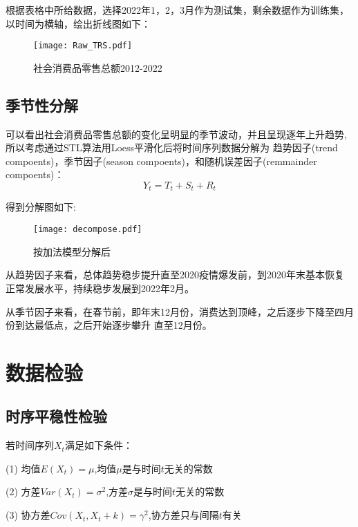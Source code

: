 \documentclass[12pt,a4paper]{nmmcm}
\begin{document}
根据表格中所给数据，选择2022年1，2，3月作为测试集，剩余数据作为训练集，以时间为横轴，绘出折线图如下：
\begin{figure}[H] %
  \centering %
  \texttt{[image: Raw\_TRS.pdf]} %
  \caption{社会消费品零售总额2012-2022} %
  \label{TRS} %
  \end{figure} 
\subsection{季节性分解}
可以看出社会消费品零售总额的变化呈明显的季节波动，并且呈现逐年上升趋势,
所以考虑通过STL算法用Loess平滑化后将时间序列数据分解为
趋势因子(trend compoents)，季节因子(season compoents)，和随机误差因子(remmainder compoents)\cite{stl}：
\begin{equation}
  Y_t = T_t + S_t + R_t
\end{equation}

得到分解图如下:
\begin{figure}[htbp] %
  \centering %
  \texttt{[image: decompose.pdf]} %
  \caption{按加法模型分解后} %
  \label{decompose} %
\end{figure} 

从趋势因子来看，总体趋势稳步提升直至2020疫情爆发前，到2020年末基本恢复
正常发展水平，持续稳步发展到2022年2月。
 \par 从季节因子来看，在春节前，即年末12月份，消费达到顶峰，之后逐步下降至四月份到达最低点，之后开始逐步攀升
直至12月份。
\section{数据检验}

\subsection{时序平稳性检验}
若时间序列\(X_t\)满足如下条件：

  (1) 均值\(E ( X_t ) = \mu \),均值\(\mu\)是与时间\(t\)无关的常数

  (2) 方差\(Var(X_t) = \sigma^2\),方差\(\sigma\)是与时间\(t\)无关的常数

  (3) 协方差\(Cov(X_t,X_t+k) = \gamma^2\),协方差只与间隔\(t\)有关  
\end{document}

